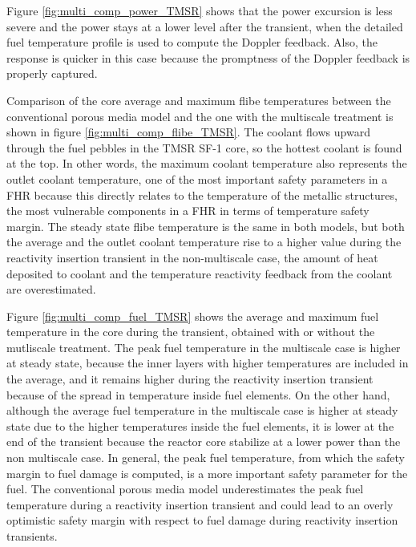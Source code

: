 \documentclass{elsarticle}
\begin{document}
Figure \ref{fig:multi_comp_power_TMSR} shows that the power excursion is less severe and the power stays at a lower level after the transient, when the detailed fuel temperature profile is used to compute the Doppler feedback. Also, the response is quicker in this case because the promptness of the Doppler feedback is properly captured. 


Comparison of the core average and maximum flibe temperatures between the conventional porous media model and the one with the multiscale treatment is shown in figure \ref{fig:multi_comp_flibe_TMSR}. 
The coolant flows upward through the fuel pebbles in the TMSR SF-1 core, so the hottest coolant is found at the top. In other words, the maximum coolant temperature also represents the outlet coolant temperature, one of the most important safety parameters in a FHR because this directly relates to the temperature of the metallic structures, the most vulnerable components in a FHR in terms of temperature safety margin.
The steady state flibe temperature is the same in both models, but both the average and the outlet coolant temperature rise to a higher value during the reactivity insertion transient in the non-multiscale case, the amount of heat deposited to coolant and the temperature reactivity feedback from the coolant are overestimated. 

Figure \ref{fig:multi_comp_fuel_TMSR} shows the average and maximum fuel temperature in the core during the transient, obtained with or without the mutliscale treatment. 
The peak fuel temperature in the multiscale case is higher at steady state, because the inner layers with higher temperatures are included in the average, and it remains higher during the reactivity insertion transient because of the spread in temperature inside fuel elements. On the other hand, although the average fuel temperature in the multiscale case is higher at steady state due to the higher temperatures inside the fuel elements, it is lower at the end of the transient because the reactor core stabilize at a lower power than the non multiscale case. In general, the peak fuel temperature, from which the safety margin to fuel damage is computed, is a more important safety parameter for the fuel. The conventional porous media model underestimates the peak fuel temperature during a reactivity insertion transient and could lead to an overly optimistic safety margin with respect to fuel damage during reactivity insertion transients. 
\end{document}
